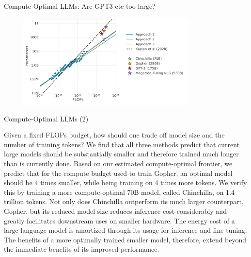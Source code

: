 \begin{vbframe}{Compute-Optimal LLMs: Are GPT3 etc  too large?}

\vfill

\begin{figure}
	\centering
	\includegraphics[width = 9cm]{./figure/chinchilla.png} \\ 
\end{figure}

\vfill

\end{vbframe}

\begin{vbframe}{Compute-Optimal LLMs (2)}


Given a fixed FLOPs budget, how should one trade off model
size and the number of training tokens? 
We find that all three methods predict that current large
models should be substantially smaller and therefore trained
much longer than is currently done.
Based on our estimated compute-optimal frontier, we predict
that for the compute budget used to train Gopher, an optimal
model should be 4 times smaller, while being training on 4
times more tokens. We verify this by training a more
compute-optimal 70B model, called Chinchilla, on 1.4
trillion tokens. Not only does Chinchilla outperform its
much larger counterpart, Gopher, but its reduced model size
reduces inference cost considerably and greatly facilitates
downstream uses on smaller hardware. The energy cost of a
large language model is amortized through its usage for
inference and fine-tuning. The benefits of a more optimally
trained smaller model, therefore, extend beyond the
immediate benefits of its improved performance.


\vfill

\end{vbframe}


